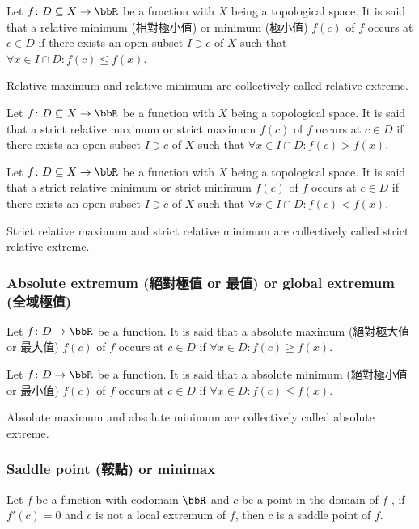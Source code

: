 \documentclass[a4paper,12pt]{report}
\begin{document}
\begin{itemize}
\begin{itemize}
Let $f\colon D\subseteq X\to\bbR$ be a function with $X$ being a topological space. It is said that a relative minimum (相對極小值) or minimum (極小值) \( f(c) \) of \(f\) occurs at $c\in D$ if there exists an open subset $I\ni c$ of $X$ such that \( \forall x\in I\cap D\colon f(c) \leq f(x) \).

Relative maximum and relative minimum are collectively called relative extreme.

Let $f\colon D\subseteq X\to\bbR$ be a function with $X$ being a topological space. It is said that a strict relative maximum or strict maximum \( f(c) \) of \(f\) occurs at $c\in D$ if there exists an open subset $I\ni c$ of $X$ such that \( \forall x\in I\cap D\colon f(c) > f(x) \).

Let $f\colon D\subseteq X\to\bbR$ be a function with $X$ being a topological space. It is said that a strict relative minimum or strict minimum \( f(c) \) of \(f\) occurs at $c\in D$ if there exists an open subset $I\ni c$ of $X$ such that \( \forall x\in I\cap D\colon f(c) < f(x) \).

Strict relative maximum and strict relative minimum are collectively called strict relative extreme.
\subsubsection{Absolute extremum (絕對極值 or 最值) or global extremum (全域極值)}
Let $f\colon D\to\bbR$ be a function. It is said that a absolute maximum (絕對極大值 or 最大值) \( f(c) \) of \(f\) occurs at $c\in D$ if \( \forall x\in D\colon f(c) \geq f(x) \).

Let $f\colon D\to\bbR$ be a function. It is said that a absolute minimum (絕對極小值 or 最小值) \( f(c) \) of \(f\) occurs at $c\in D$ if \( \forall x\in D\colon f(c) \leq f(x) \).

Absolute maximum and absolute minimum are collectively called absolute extreme.
\subsubsection{Saddle point (鞍點) or minimax}
Let $f$ be a function with codomain $\bbR$ and \( c \) be a point in the domain of $f$ , if \( f'(c) = 0 \) and $c$ is not a local extremum of $f$, then $c$ is a saddle point of $f$.

\end{itemize}
\end{itemize}
\end{document}
